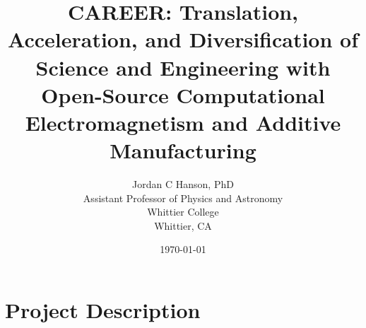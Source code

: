 \documentclass[10pt,twoside,openany]{book}
\title{CAREER: Translation, Acceleration, and Diversification of Science and Engineering with Open-Source Computational Electromagnetism and Additive Manufacturing}
\author{Jordan C Hanson, PhD \\ Assistant Professor of Physics and Astronomy \\ Whittier College \\ Whittier, CA}
\date{\today}
\begin{document}
\begin{flushleft}

\end{flushleft}

\begin{flushleft}

\end{flushleft}

\maketitle
\tableofcontents
\thispagestyle{empty}

\chapter{Project Description}
\thispagestyle{empty}
\begin{flushleft}

\end{flushleft}

\small


 
\end{document}
